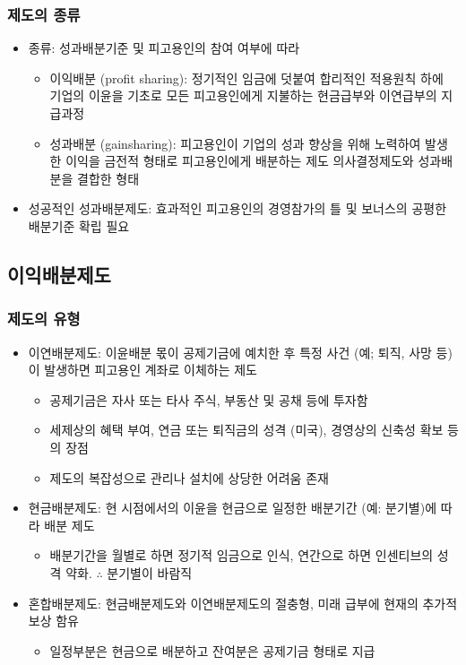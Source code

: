 \documentclass[aspectratio=169,xcolor=dvipsnames,handout]{beamer}
\begin{document}
\begin{frame}[allowframebreaks]
    \frametitle{제도의 종류}
    \begin{itemize}[<+->]
        \item 종류: 성과배분기준 및 피고용인의 참여 여부에 따라 
        \begin{itemize}[<+->]
            \item 이익배분 (profit sharing): 정기적인 임금에 덧붙여 합리적인 적용원칙 하에 기업의 이윤을 기초로 모든 피고용인에게 지불하는 현금급부와 이연급부의 지급과정
            \item 성과배분 (gainsharing): 피고용인이 기업의 성과 향상을 위해 노력하여 발생한 이익을 금전적 형태로 피고용인에게 배분하는 제도 의사결정제도와 성과배분을 결합한 형태
        \end{itemize}
        \item 성공적인 성과배분제도: 효과적인 피고용인의 경영참가의 틀 및 보너스의 공평한 배분기준 확립 필요
    \end{itemize}
\end{frame}

\subsection{이익배분제도}%

\begin{frame}[allowframebreaks]
    \frametitle{제도의 유형}
    \begin{itemize}[<+->]
        \item 이연배분제도: 이윤배분 몫이 공제기금에 예치한 후 특정 사건 (예; 퇴직, 사망 등)이 발생하면 피고용인 계좌로 이체하는 제도
        \begin{itemize}[<+->]
            \item 공제기금은 자사 또는 타사 주식, 부동산 및 공채 등에 투자함
            \item 세제상의 혜택 부여, 연금 또는 퇴직금의 성격 (미국), 경영상의 신축성 확보 등의 장점
            \item 제도의 복잡성으로 관리나 설치에 상당한 어려움 존재
        \end{itemize}
    \framebreak%
        \item 현금배분제도: 현 시점에서의 이윤을 현금으로 일정한 배분기간 (예: 분기별)에 따라 배분 제도
        \begin{itemize}[<+->]
            \item 배분기간을 월별로 하면 정기적 임금으로 인식, 연간으로 하면 인센티브의 성격 약화. $\therefore$ 분기별이 바람직
        \end{itemize}
        \item 혼합배분제도: 현금배분제도와 이연배분제도의 절충형, 미래 급부에 현재의 추가적 보상 함유
        \begin{itemize}[<+->]
            \item 일정부분은 현금으로 배분하고 잔여분은 공제기금 형태로 지급
        \end{itemize}
    \end{itemize}
\end{frame}
\end{document}
